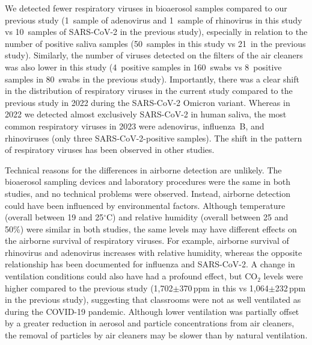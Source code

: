 \documentclass[fleqn,11pt]{wlscirep}
\begin{document}
We detected fewer respiratory viruses in bioaerosol samples compared to our previous study\cite{Banholzer2023PLoSMed} (1~sample of adenovirus and 1~sample of rhinovirus in this study vs 10~samples of SARS-CoV-2 in the previous study), especially in relation to the number of positive saliva samples (50~samples in this study vs 21~in the previous study). Similarly, the number of viruses detected on the filters of the air cleaners was also lower in this study (4~positive samples in 160~swabs vs 8~positive samples in 80~swabs in the previous study). Importantly, there was a clear shift in the distribution of respiratory viruses in the current study compared to the previous study in 2022 during the SARS-CoV-2 Omicron variant. Whereas in 2022 we detected almost exclusively SARS-CoV-2 in human saliva, the most common respiratory viruses in 2023 were adenovirus, influenza~B, and rhinoviruses (only three SARS-CoV-2-positive samples). The shift in the pattern of respiratory viruses has been observed in other studies\cite{Nygaard2023Lancet,Sauteur2022EuroSurv}. 


Technical reasons for the differences in airborne detection are unlikely. The bioaerosol sampling devices and laboratory procedures were the same in both studies, and no technical problems were observed. Instead, airborne detection could have been influenced by environmental factors. Although temperature (overall between 19 and 25$^{\circ}$C) and relative humidity (overall between 25 and 50\%) were similar in both studies, the same levels may have different effects on the airborne survival of respiratory viruses. For example, airborne survival of rhinovirus and adenovirus increases with relative humidity, whereas the opposite relationship has been documented for influenza and SARS-CoV-2\cite{Tellier2009JTRSI,Ahlawat2020AAQR,Biryukov2020mS,Karim1985CJM,Davis1971AM}. A change in ventilation conditions could also have had a profound effect, but CO$_2$ levels were higher compared to the previous study (1,702$\pm$370\,ppm in this vs 1,064$\pm$232\,ppm in the previous study), suggesting that classrooms were not as well ventilated as during the COVID-19 pandemic. Although lower ventilation was partially offset by a greater reduction in aerosol and particle concentrations from air cleaners, the removal of particles by air cleaners may be slower than by natural ventilation.

\end{document}
